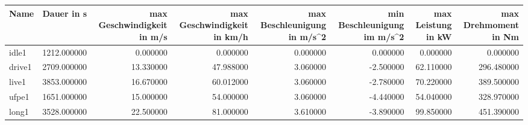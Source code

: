 \begin{tabular}{lrrrrrrr}
\toprule
Name & Dauer in s & max Geschwindigkeit in m/s & max Geschwindigkeit in km/h & max Beschleunigung in m/s^2 & min Beschleunigung im m/s^2 & max Leistung in kW & max Drehmoment in Nm \\
\midrule
idle1 & 1212.000000 & 0.000000 & 0.000000 & 0.000000 & 0.000000 & 0.000000 & 0.000000 \\
drive1 & 2709.000000 & 13.330000 & 47.988000 & 3.060000 & -2.500000 & 62.110000 & 296.480000 \\
live1 & 3853.000000 & 16.670000 & 60.012000 & 3.060000 & -2.780000 & 70.220000 & 389.500000 \\
ufpe1 & 1651.000000 & 15.000000 & 54.000000 & 3.060000 & -4.440000 & 54.040000 & 328.970000 \\
long1 & 3528.000000 & 22.500000 & 81.000000 & 3.610000 & -3.890000 & 99.850000 & 451.390000 \\
\bottomrule
\end{tabular}
